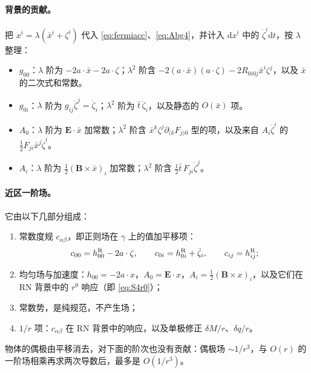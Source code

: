 \documentclass[11pt,a4paper]{ctexart}
\numberwithin{equation}{section}
\newcommand{\dd}{\mathrm d}
\begin{document}
\paragraph{背景的贡献。}把 $x^i=\lambda(\bar x^i+\zeta^i)$ 代入 \eqref{eq:fermiacc}、\eqref{eq:Abg4}，并计入 $\dd x^i$ 中的 $\dot\zeta^i\dd t$，按 $\lambda$ 整理：
\begin{itemize}
\item $g_{00}$：$\lambda$ 阶为 $-2a\cdot\bar x-2a\cdot\zeta$；$\lambda^2$ 阶含 $-2(a\cdot\bar x)(a\cdot\zeta)-2R_{0i0j}\bar x^i\zeta^j$，以及 $\bar x$ 的二次式和常数。
\item $g_{0i}$：$\lambda$ 阶为 $g_{ij}\dot\zeta^j=\dot\zeta_i$；$\lambda^2$ 阶为 $\bar t\,\ddot\zeta_i$，以及静态的 $O(\bar x)$ 项。
\item $A_0$：$\lambda$ 阶为 $\boldsymbol E\cdot\bar x$ 加常数；$\lambda^2$ 阶含 $\bar x^k\zeta^j\partial_{(k}F_{j)0}$ 型的项，以及来自 $A_i\dot\zeta^i$ 的 $\tfrac12F_{ji}\bar x^j\dot\zeta^i$。
\item $A_i$：$\lambda$ 阶为 $\tfrac12(\boldsymbol B\times\bar x)_i$ 加常数；$\lambda^2$ 阶含 $\tfrac12\bar t\,F_{ji}\dot\zeta^j$。
\end{itemize}

\paragraph{近区一阶场。}它由以下几部分组成：
\begin{enumerate}
\item 常数度规 $c_{\alpha\beta}$，即正则场在 $\gamma$ 上的值加平移项：
\begin{equation}
c_{00}=h^{\rm R}_{00}-2a\cdot\zeta,\qquad c_{0i}=h^{\rm R}_{0i}+\dot\zeta_i,\qquad c_{ij}=h^{\rm R}_{ij} ;
\label{eq:c4}
\end{equation}
\item 均匀场与加速度：$h_{00}=-2a\cdot x$，$A_0=\boldsymbol E\cdot x$，$A_i=\tfrac12(\boldsymbol B\times x)_i$，以及它们在 RN 背景中的 $r^0$ 响应（即 \eqref{eq:S4r0}）；
\item 常数势，是纯规范，不产生场；
\item $1/r$ 项：$c_{\alpha\beta}$ 在 RN 背景中的响应，以及单极修正 $\delta M/r$、$\delta q/r$。
\end{enumerate}
物体的偶极由平移消去，对下面的阶次也没有贡献：偶极场 $\sim1/r^3$，与 $O(r)$ 的一阶场相乘再求两次导数后，最多是 $O(1/r^3)$。
\end{document}
